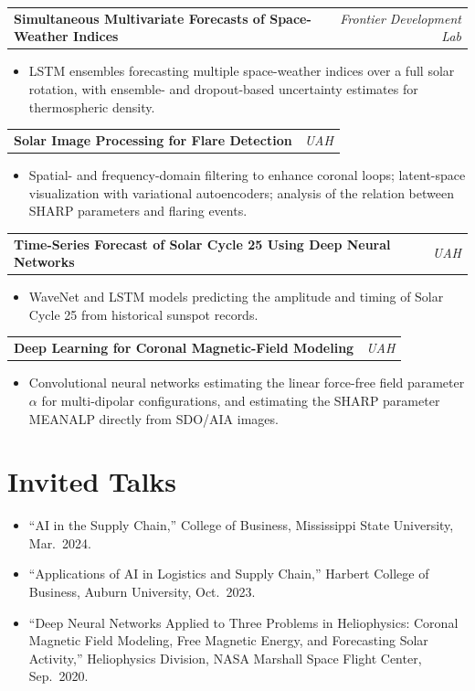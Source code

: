 \documentclass[11pt,letterpaper]{article}
\makeatletter
\newcommand{\daterow}[2]{%
  \noindent\begin{tabularx}{\textwidth}{@{}X r@{}}#1 & #2\end{tabularx}\par
}
\makeatother
\begin{document}
\daterow{\textbf{Simultaneous Multivariate Forecasts of Space-Weather Indices}}{\textit{Frontier Development Lab}}
\begin{itemize}
  \item LSTM ensembles forecasting multiple space-weather indices over a full solar rotation, with ensemble- and dropout-based uncertainty estimates for thermospheric density.
\end{itemize}

\daterow{\textbf{Solar Image Processing for Flare Detection}}{\textit{UAH}}
\begin{itemize}
  \item Spatial- and frequency-domain filtering to enhance coronal loops; latent-space visualization with variational autoencoders; analysis of the relation between SHARP parameters and flaring events.
\end{itemize}

\daterow{\textbf{Time-Series Forecast of Solar Cycle 25 Using Deep Neural Networks}}{\textit{UAH}}
\begin{itemize}
  \item WaveNet and LSTM models predicting the amplitude and timing of Solar Cycle 25 from historical sunspot records.
\end{itemize}

\daterow{\textbf{Deep Learning for Coronal Magnetic-Field Modeling}}{\textit{UAH}}
\begin{itemize}
  \item Convolutional neural networks estimating the linear force-free field parameter $\alpha$ for multi-dipolar configurations, and estimating the SHARP parameter MEANALP directly from SDO/AIA images.
\end{itemize}

\section{Invited Talks}
\begin{itemize}
  \item ``AI in the Supply Chain,'' College of Business, Mississippi State University, Mar.~2024.
  \item ``Applications of AI in Logistics and Supply Chain,'' Harbert College of Business, Auburn University, Oct.~2023.
  \item ``Deep Neural Networks Applied to Three Problems in Heliophysics: Coronal Magnetic Field Modeling, Free Magnetic Energy, and Forecasting Solar Activity,'' Heliophysics Division, NASA Marshall Space Flight Center, Sep.~2020.
\end{itemize}
\end{document}
